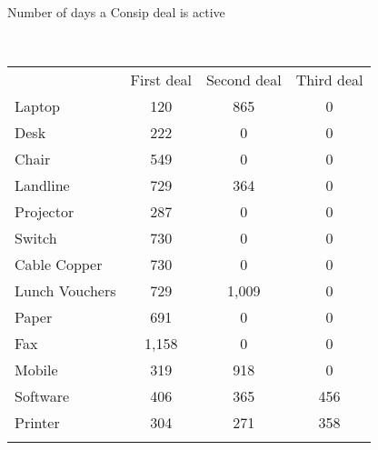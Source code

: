 \begin{center}
\smallskip\begin{large}Number of days a Consip deal is active\end{large}\\
\smallskip
\begin{tabular}{lccc}
\hline \noalign{\smallskip} & First deal & Second deal & Third deal\\
\noalign{\smallskip}\hline \noalign{\smallskip}Laptop & 120 & 865 & 0\\
Desk & 222 & 0 & 0\\
Chair & 549 & 0 & 0\\
Landline & 729 & 364 & 0\\
Projector & 287 & 0 & 0\\
Switch & 730 & 0 & 0\\
Cable Copper & 730 & 0 & 0\\
Lunch Vouchers & 729 & 1,009 & 0\\
Paper & 691 & 0 & 0\\
Fax & 1,158 & 0 & 0\\
Mobile & 319 & 918 & 0\\
Software & 406 & 365 & 456\\
Printer & 304 & 271 & 358\\
\noalign{\smallskip}\hline\end{tabular}\\
\end{center}
